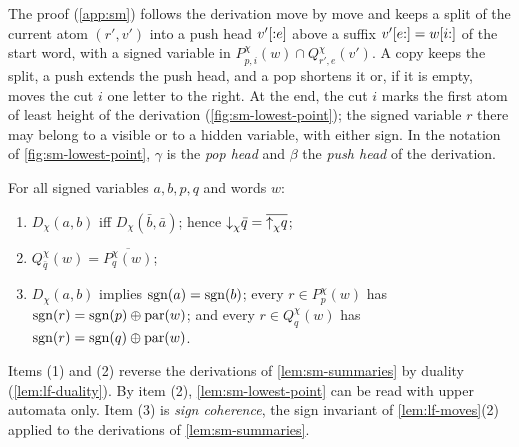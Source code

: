 The proof (\cref{app:sm}) follows the derivation move by move and keeps a
split of the current atom $(r',v')$ into a push head $v'[{:}e]$ above a
suffix $v'[e{:}]=w[i{:}]$ of the start word, with a signed variable in
$P^\chi_{p,i}(w)\cap Q^\chi_{r',e}(v')$. A copy keeps the split, a push
extends the push head, and a pop shortens it or, if it is empty, moves the cut
$i$ one letter to the right. At the end, the cut $i$ marks the first atom of
least height of the derivation (\cref{fig:sm-lowest-point}); the signed variable $r$ there may belong to a
visible or to a hidden variable, with either sign. In the notation of
\cref{fig:sm-lowest-point}, $\gamma$ is the \emph{pop head} and $\beta$ the
\emph{push head} of the derivation.

\begin{lemma}\label{lem:sm-duality}
For all signed variables $a,b,p,q$ and words $w$:
\begin{enumerate}[leftmargin=*]
\item $D_\chi(a,b)$ iff $D_\chi(\bar b,\bar a)$; hence
  $\mathord{\downarrow}_{\chi}{\bar q}=\overline{\mathord{\uparrow}_{\chi} q}$;
\item $Q^\chi_{\bar q}(w)=\overline{P^\chi_q(w)}$;
\item $D_\chi(a,b)$ implies $\operatorname{sgn}(a)=\operatorname{sgn}(b)$; every $r\in P^\chi_p(w)$ has
  $\operatorname{sgn}(r)=\operatorname{sgn}(p)\oplus\operatorname{par}(w)$; and every $r\in Q^\chi_q(w)$ has
  $\operatorname{sgn}(r)=\operatorname{sgn}(q)\oplus\operatorname{par}(w)$.
\end{enumerate}
\end{lemma}

Items (1) and (2) reverse the derivations of \cref{lem:sm-summaries} by
duality (\cref{lem:lf-duality}). By item (2), \cref{lem:sm-lowest-point} can be read with upper
automata only. Item (3) is \emph{sign coherence}, the sign invariant of
\cref{lem:lf-moves}(2) applied to the derivations of \cref{lem:sm-summaries}.

